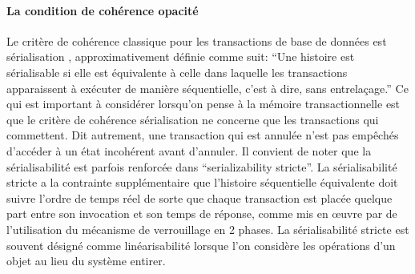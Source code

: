 \paragraph {La condition de cohérence opacité}
Le critère de cohérence classique pour les transactions de base de données est sérialisation \cite{P79}, approximativement définie comme suit:
``Une histoire est sérialisable si elle est équivalente à celle dans laquelle les transactions apparaissent à exécuter de manière séquentielle, c'est à dire, sans entrelaçage.''
Ce qui est important à considérer lorsqu'on pense à la mémoire transactionnelle est que le critère de cohérence sérialisation ne concerne que les transactions qui commettent.
Dit autrement, une transaction qui est annulée n'est pas empêchés d'accéder à un état incohérent avant d'annuler.
Il convient de noter que la sérialisabilité est parfois renforcée dans ``serializability stricte''.
La sérialisabilité stricte a la contrainte supplémentaire que l'histoire séquentielle équivalente doit suivre l'ordre de temps réel
de sorte que chaque transaction est placée quelque part entre son invocation et son temps de réponse, comme mis en œuvre par de l'utilisation du mécanisme de verrouillage en 2 phases.
La sérialisabilité stricte est souvent désigné comme linéarisabilité \cite{HW90} lorsque l'on considère les opérations d'un objet au lieu du système entirer.



